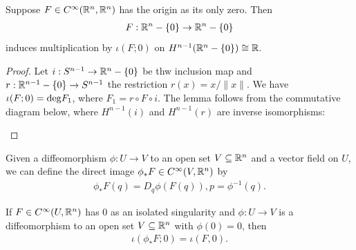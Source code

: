 \begin{lemma}\label{lemma:11-17}
  Suppose $F\in C^\infty({\mathbb{R}}^n, {\mathbb{R}}^n)$ has the origin as its only zero. Then 
  \begin{align*}
    F:{\mathbb{R}}^n - \{0\}\to {\ensuremath{\mathbb{R}}}^n - \{0\}
  \end{align*}
  induces multiplication by $\iota(F; 0)$ on $H^{n-1}({\mathbb{R}}^n - \{0\})\cong {\ensuremath{\mathbb{R}}}$.
\end{lemma}

\begin{proof}
  Let $i:S^{n-1}\to{\ensuremath{\mathbb{R}}}^n-\{0\}$ be thw inclusion map and $r:{\mathbb{R}}^{n-1}-\{0\}\to S^{n-1}$ the 
  restriction $r(x) = x/\|x\|$. We have $\iota(F; 0) = \mathrm{deg}F_1$, where $F_1 = r\circ F\circ i$.
  The lemma follows from the commutative diagram below, where $H^{n-1}(i)$ and $H^{n-1}(r)$ are inverse 
  isomorphisms:
  \begin{center}
  \end{center}
\end{proof}

Given a diffeomorphism $\phi:U\to V$ to an open set $V\subseteq {\ensuremath{\mathbb{R}}}^n$ and a vector field on 
$U$, we can define the direct image $\phi_*F \in C^\infty(V, {\mathbb{R}}^n)$ by 
\begin{align*}
  \phi_*F(q) = D_q\phi(F(q)), p = \phi^{-1}(q).
\end{align*}

\begin{lemma}\label{lemma:11-18}
  If $F\in C^\infty(U, {\mathbb{R}}^n)$ has 0 as an isolated singularity and $\phi:U\to V$
  is a diffeomorphism to an open set $V\subseteq {\ensuremath{\mathbb{R}}}^n$ with $\phi(0) = 0$, then 
  \begin{align*}
    \iota(\phi_*F; 0) = \iota(F, 0).
  \end{align*}
\end{lemma}

